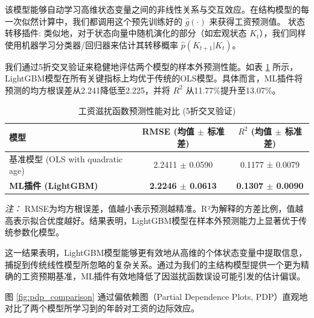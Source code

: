 \documentclass[
  a4paper,
  zihao=-4,
  fontset=mac,
  AutoFakeBold,
  AutoFakeSlant,
  oneside]{ctexbook}
\begin{document}
该模型能够自动学习高维状态变量之间的非线性关系与交互效应。在结构模型的每一次似然计算中，我们都调用这个预先训练好的 $\hat{g}(\cdot)$ 来获得工资预测值。
状态转移插件: 类似地，对于状态向量中随机演化的部分（如宏观状态 $K_t$），我们同样使用机器学习分类器/回归器来估计其转移概率 $\hat{p}(K_{t+1} | K_t)$。


我们通过5折交叉验证来稳健地评估两个模型的样本外预测性能。如表 \ref{tab:ml_performance_comparison} 所示，LightGBM模型在所有关键指标上均优于传统的OLS模型。具体而言，ML插件将预测的均方根误差从2.241降低至2.225，并将 $R^2$ 从11.77\%提升至13.07\%。

\begin{table}[!ht]
\centering
\caption{工资滋扰函数预测性能对比 (5折交叉验证)}
\label{tab:ml_performance_comparison}
\begin{tabular}{lcc}
\toprule
\textbf{模型} & \textbf{RMSE (均值 $\pm$ 标准差)} & \textbf{$R^2$ (均值 $\pm$ 标准差)} \\
\midrule
基准模型 (OLS with quadratic age) & 2.2411 $\pm$ 0.0590 & 0.1177 ± 0.0079 \\
\textbf{ML插件 (LightGBM)} & \textbf{2.2246 $\pm$ 0.0613} & \textbf{0.1307 $\pm$ 0.0090} \\
\bottomrule
\end{tabular}
\vspace{1em}
\begin{minipage}{\linewidth}
\small
\textit{注：} RMSE为均方根误差，值越小表示预测越精准。R²为解释的方差比例，值越高表示拟合优度越好。结果表明，LightGBM模型在样本外预测能力上显著优于传统参数化模型。
\end{minipage}
\end{table}
这一结果表明，LightGBM模型能够更有效地从高维的个体状态变量中提取信息，捕捉到传统线性模型所忽略的复杂关系。通过为我们的主结构模型提供一个更为精确的工资预期基准，ML插件有效地降低了因滋扰函数误设可能引发的估计偏误。


图 \ref{fig:pdp_comparison} 通过偏依赖图（Partial Dependence Plots, PDP）直观地对比了两个模型所学习到的年龄对工资的边际效应。
\end{document}
